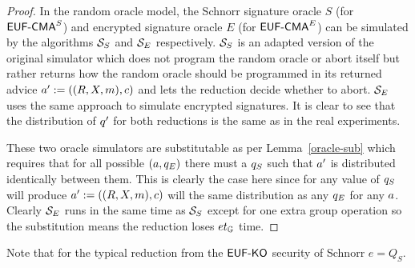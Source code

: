 \begin{proof}

  In the random oracle model, the Schnorr signature oracle $S$ (for $\textsf{EUF-CMA}^S$) and encrypted signature oracle $E$ (for $\textsf{EUF-CMA}^E$) can be simulated by the algorithms $\mathcal{S}_S$ and  $\mathcal{S}_E$ respectively.
  $\mathcal{S}_S$ is an adapted version of the original simulator which does not program the random oracle or abort itself but rather returns how the random oracle should be programmed in its returned advice $a' := ((R,X,m),c)$ and lets the reduction decide whether to abort.
  $\mathcal{S}_E$ uses the same approach to simulate encrypted signatures.
  It is clear to see that the distribution of $q'$ for both reductions is the same as in the real experiments.

  \begin{center}
  \end{center}

  These two oracle simulators are substitutable as per Lemma~\ref{oracle-sub} which requires that for all possible $(a, q_E)$ there must a $q_S$ such that $a'$ is distributed identically between them.
  This is clearly the case here since for any value of $q_S$ will produce $a' := ((R,X,m), c)$ will the same distribution as any $q_E$ for any $a$.
  Clearly $\mathcal{S}_E$ runs in the same time as $\mathcal{S}_S$ except for one extra group operation so the substitution means the reduction loses $et_{\mathbb{G}}$ time.
\end{proof}

Note that for the typical reduction\cite{pointcheval2000security} from the $\textsf{EUF-KO}$ security of Schnorr $e = Q_S$.
